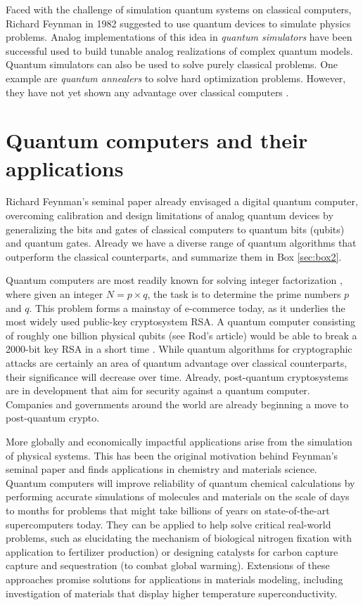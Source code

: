 \documentclass[journal]{IEEEtran}
\begin{document}
Faced with the challenge of simulation quantum systems on classical computers, Richard Feynman in 1982 \cite{Feynman1982} suggested to use quantum devices to simulate physics problems. Analog implementations of this idea in {\em quantum simulators }  \cite{RevModPhys.86.153}  have  been successful used to build tunable analog realizations of complex quantum models. Quantum simulators can also be used to solve purely classical problems. One example are {\em quantum annealers} to solve hard optimization problems. However, they have not  yet shown any advantage over classical computers \cite{speedup}. 

\section{Quantum computers and their applications}

Richard Feynman's seminal paper already envisaged a digital quantum computer, overcoming calibration and design limitations of analog quantum devices by generalizing the bits and gates of classical computers to quantum bits (qubits) and quantum gates. Already we have a diverse range of quantum algorithms that outperform the classical counterparts, and summarize them in Box \ref{sec:box2}.

Quantum computers are most readily known for solving integer factorization \cite{Shor1994}, where given an integer $N=p\times q$, the task is to determine the prime numbers $p$ and $q$.  This problem forms a mainstay of e-commerce today, as it underlies the most widely used public-key cryptosystem RSA.  A quantum computer consisting of roughly one billion physical qubits {\color{red}(see Rod's article)} would be able to break a 2000-bit key RSA in a short time \cite{}.  While quantum algorithms for cryptographic attacks are certainly an area of quantum advantage over classical counterparts, their significance will decrease over time.  Already, post-quantum cryptosystems are in development that aim for security against a quantum computer.  Companies and governments around the world are already beginning a move to post-quantum crypto.  

More globally and economically impactful applications arise from the simulation of physical systems. This has been the original motivation behind Feynman's seminal paper and finds applications in chemistry and materials science. Quantum computers will improve reliability of quantum chemical calculations by performing accurate simulations of molecules and materials on the scale of days to months for problems that might take billions of years on state-of-the-art supercomputers today. They can be applied to help solve critical real-world problems, such as elucidating the mechanism of biological nitrogen fixation with application to fertilizer production) or designing catalysts for carbon capture  capture and sequestration (to combat global warming).  Extensions of these approaches promise solutions for applications in materials modeling, including investigation of materials that display higher temperature superconductivity. 
\end{document}
